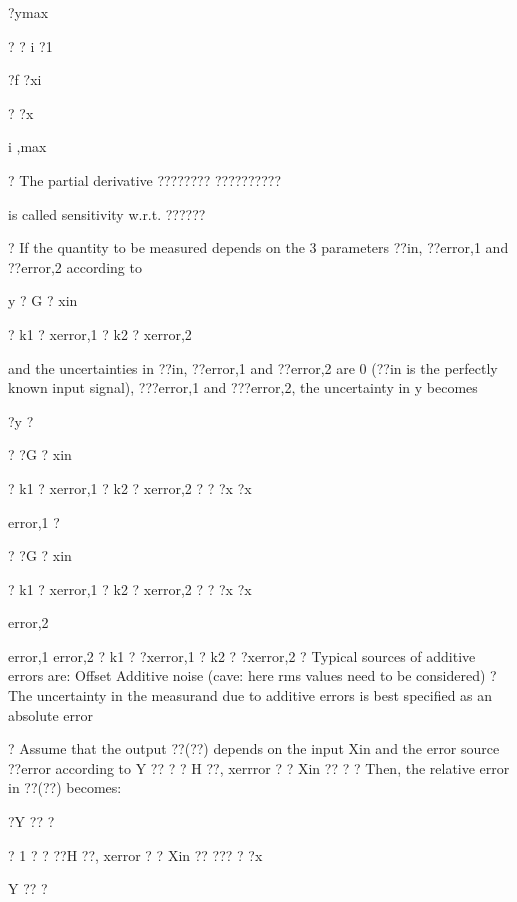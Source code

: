 \documentclass[2pt,landscape]{article}
\begin{document}
\begin{multicols*}{5}
?ymax




? ?
i ?1


?f 
?xi



? ?x




i ,max






?	The partial derivative ????????
??????????


is called sensitivity w.r.t. ??????





?	If the quantity to be measured depends on the 3 parameters ??in, ??error,1
and ??error,2 according to


y ? G ? xin


?	k1 ? xerror,1 ? k2 ? xerror,2



and the uncertainties in ??in, ??error,1 and ??error,2 are 0 (??in is the perfectly 
known input signal), ???error,1 and ???error,2, the uncertainty in y becomes



?y ?


? ?G ? xin


?	k1 ? 
xerror,1 ? 
k2 ? 
xerror,2 ? ? 
?x
?x



error,1 ?


? ?G ? xin


?	k1 ? 
xerror,1 ? 
k2 ? 
xerror,2 ? ? 
?x
?x





error,2


error,1	error,2
? k1 ? ?xerror,1 ? k2 ? ?xerror,2
?	Typical sources of additive errors are:
\textbullet 	Offset
\textbullet 	Additive noise (cave: here rms values need to be considered)
?	The uncertainty in the measurand due to additive errors is best 
specified as an absolute error



?	Assume that the output ??(??) depends on the input Xin and the error 
source ??error according to
Y ?? ? ? H ??, xerrror ? ? Xin ?? ?
?	Then, the relative error in ??(??) becomes:


?Y ?? ?


?  	1	 ? ? ??H ??, xerror ? ? Xin ?? 
??? ? ?x




Y ?? ?



\end{multicols*}
\end{document}
